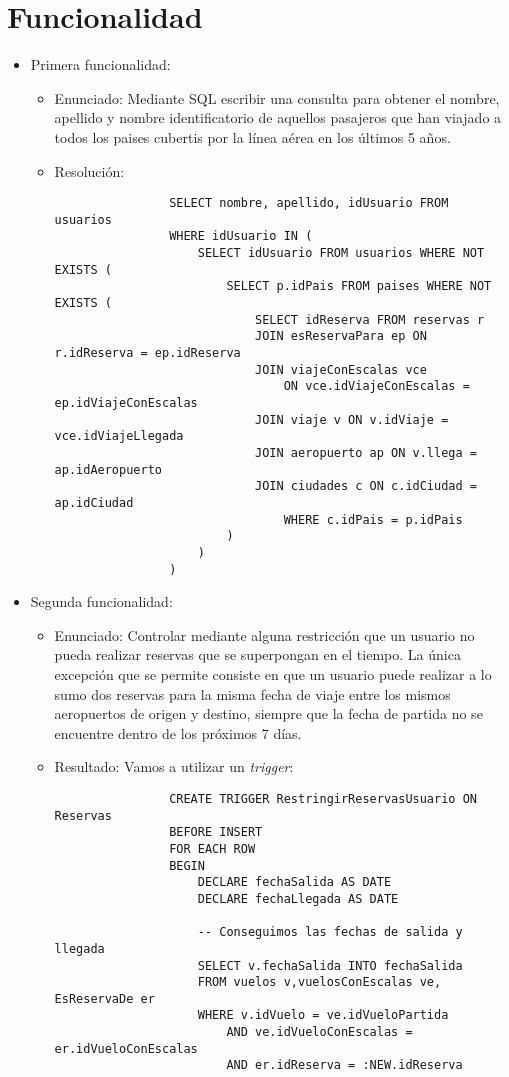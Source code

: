 \section{Funcionalidad}

\begin{itemize}
	\item Primera funcionalidad:
		\begin{itemize}
			\item Enunciado: Mediante SQL escribir una consulta para obtener el nombre, apellido y nombre
			identificatorio de aquellos pasajeros que han viajado a todos los paises cubertis por la l\'inea
			a\'erea en los \'ultimos 5 a\~nos.

			\item Resoluci\'on:

			\begin{lstlisting}
				SELECT nombre, apellido, idUsuario FROM usuarios
				WHERE idUsuario IN (
					SELECT idUsuario FROM usuarios WHERE NOT EXISTS (
						SELECT p.idPais FROM paises WHERE NOT EXISTS (
							SELECT idReserva FROM reservas r
							JOIN esReservaPara ep ON r.idReserva = ep.idReserva
							JOIN viajeConEscalas vce 
								ON vce.idViajeConEscalas = ep.idViajeConEscalas
							JOIN viaje v ON v.idViaje = vce.idViajeLlegada
							JOIN aeropuerto ap ON v.llega = ap.idAeropuerto
							JOIN ciudades c ON c.idCiudad = ap.idCiudad
								WHERE c.idPais = p.idPais
						)
					)
				)
			\end{lstlisting}
		\end{itemize}
	\item Segunda funcionalidad:
		\begin{itemize}
			\item Enunciado: Controlar mediante alguna restricci\'on que un usuario no pueda realizar
			reservas que se superpongan en el tiempo. La \'unica excepci\'on que se permite consiste en
			que un usuario puede realizar a lo sumo dos reservas para la misma fecha de viaje entre los
			mismos aeropuertos de origen y destino, siempre que la fecha de partida no se encuentre dentro
			de los pr\'oximos 7 d\'ias.
			\item Resultado: Vamos a utilizar un \textit{trigger}:

			\begin{lstlisting}
				CREATE TRIGGER RestringirReservasUsuario ON Reservas
				BEFORE INSERT
				FOR EACH ROW
				BEGIN
					DECLARE fechaSalida AS DATE
					DECLARE fechaLlegada AS DATE
					
					-- Conseguimos las fechas de salida y llegada
					SELECT v.fechaSalida INTO fechaSalida 
					FROM vuelos v,vuelosConEscalas ve, EsReservaDe er
					WHERE v.idVuelo = ve.idVueloPartida
						AND ve.idVueloConEscalas = er.idVueloConEscalas
						AND er.idReserva = :NEW.idReserva


\end{lstlisting}
\end{itemize}
\end{itemize}
